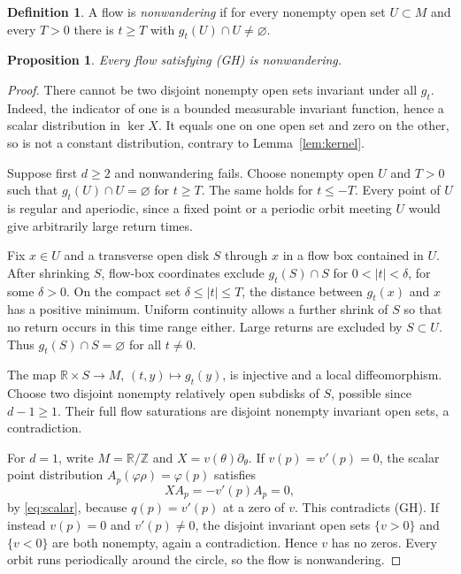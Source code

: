 \documentclass[11pt]{article}
\newtheorem{proposition}[theorem]{Proposition}
\theoremstyle{definition}
\newtheorem{definition}[theorem]{Definition}
\theoremstyle{remark}
\newcommand{\R}{\mathbb R}
\begin{document}
\begin{definition}
A flow is \emph{nonwandering} if for every nonempty open set $U\subset M$ and every $T>0$ there is $t\ge T$ with $g_t(U)\cap U\ne\varnothing$.
\end{definition}

\begin{proposition}\label{prop:nonwandering}
Every flow satisfying (GH) is nonwandering.
\end{proposition}
\begin{proof}
There cannot be two disjoint nonempty open sets invariant under all $g_t$. Indeed, the indicator of one is a bounded measurable invariant function, hence a scalar distribution in $\ker X$. It equals one on one open set and zero on the other, so is not a constant distribution, contrary to Lemma~\ref{lem:kernel}.

Suppose first $d\ge2$ and nonwandering fails. Choose nonempty open $U$ and $T>0$ such that $g_t(U)\cap U=\varnothing$ for $t\ge T$. The same holds for $t\le-T$. Every point of $U$ is regular and aperiodic, since a fixed point or a periodic orbit meeting $U$ would give arbitrarily large return times.

Fix $x\in U$ and a transverse open disk $S$ through $x$ in a flow box contained in $U$. After shrinking $S$, flow-box coordinates exclude $g_t(S)\cap S$ for $0<|t|<\delta$, for some $\delta>0$. On the compact set $\delta\le|t|\le T$, the distance between $g_t(x)$ and $x$ has a positive minimum. Uniform continuity allows a further shrink of $S$ so that no return occurs in this time range either. Large returns are excluded by $S\subset U$. Thus $g_t(S)\cap S=\varnothing$ for all $t\ne0$.

The map $\R\times S\to M$, $(t,y)\mapsto g_t(y)$, is injective and a local diffeomorphism. Choose two disjoint nonempty relatively open subdisks of $S$, possible since $d-1\ge1$. Their full flow saturations are disjoint nonempty invariant open sets, a contradiction.

For $d=1$, write $M=\R/\mathbb Z$ and $X=v(\theta)\partial_\theta$. If $v(p)=v'(p)=0$, the scalar point distribution $A_p(\varphi\rho)=\varphi(p)$ satisfies
\[
 XA_p=-v'(p)A_p=0,
\]
by \eqref{eq:scalar}, because $q(p)=v'(p)$ at a zero of $v$. This contradicts (GH). If instead $v(p)=0$ and $v'(p)\ne0$, the disjoint invariant open sets $\{v>0\}$ and $\{v<0\}$ are both nonempty, again a contradiction. Hence $v$ has no zeros. Every orbit runs periodically around the circle, so the flow is nonwandering.
\end{proof}
\end{document}
